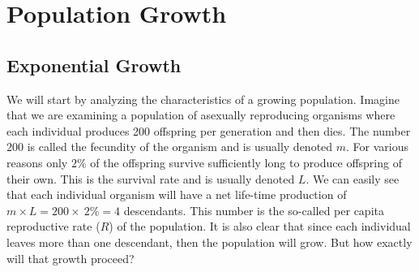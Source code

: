 \documentclass[11pt,a4paper]{book}
\begin{document}
\section{Population Growth}
\subsection{Exponential Growth}

We will start by analyzing the characteristics of a growing population. Imagine that we are examining a population of asexually reproducing organisms where each individual produces 200 offspring per generation and then dies. The number $200$ is called the fecundity of the organism and is usually denoted $m$. For various reasons only $2\%$ of the offspring survive sufficiently long to produce offspring of their own. This is the survival rate and is usually denoted $L$. We can easily see that each individual organism will have a net life-time production of $m\times L=200\times~2\%=4$ descendants. This number is the so-called per capita reproductive rate ($R$) of the population. It is also clear that since each individual leaves more than one descendant, then the population will grow. But how exactly will that growth proceed? 
\end{document}
